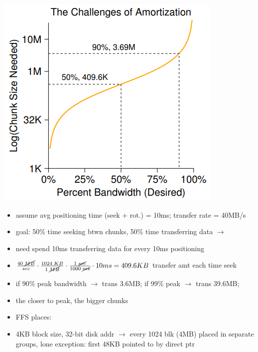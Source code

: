 \begin{minipage}{.45\linewidth}
  \includegraphics[width=\linewidth]{imgs/ffs_amortization}
\end{minipage}
\begin{minipage}{.55\linewidth}
  \flushleft
  \begin{itemize}
  \item assume avg positioning time (seek + rot.) = 10ms; transfer rate = 40MB/s
  \item goal: 50\% time seeking btwn chunks, 50\% time transferring data $\to$
  \item need spend 10ms transferring data for every 10ms positioning
  \item $\frac{40\;\cancel{MB}}{sec}\cdot\frac{1024\;KB}{1\;\cancel{MB}}\cdot\frac{1\;\cancel{sec}}{1000\;\cancel{ms}}\cdot 10ms = 409.6KB$ transfer amt each time seek
  \item if 90\% peak bandwidth $\to$ trans 3.6MB; if 99\% peak $\to$ trans 39.6MB;
  \item the closer to peak, the bigger chunks
  \end{itemize}
\end{minipage}
\begin{itemize}
\item FFS places:
\item 4KB block size, 32-bit disk addr $\to$ every 1024 blk (4MB) placed in separate groups, lone exception: first 48KB pointed to by direct ptr
\end{itemize}
